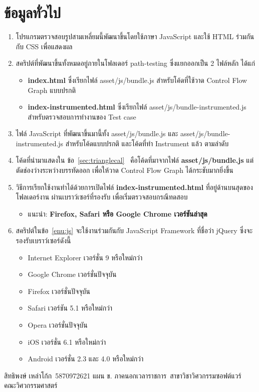 \documentclass[12pt,a4paper]{article}
\newcommand{\sitdhibong}{สิทธิพงษ์ เหล่าโก้ก}
\newcommand{\studentid}{5870972621}
\newcommand{\department}{สาขาวิชาวิศวกรรมซอฟต์แวร์}
\newcommand{\faculty}{คณะวิศวกรรมศาสตร์}
\newcommand{\myprogram}{แผน ข. ภาคนอกเวลาราชการ}
\newcommand{\numbername}{ข้อ}
\begin{document}
   \section{ข้อมูลทั่วไป}
   \label{sec:general}
   \begin{enumerate}
       \item โปรแกรมตรวจสอบรูปสามเหลี่ยมนี้พัฒนาขึ้นโดยใช้ภาษา JavaScript และใช้ HTML ร่วมกันกับ CSS เพื่อแสดงผล
       \item สคริปต์ที่พัฒนาขึ้นทั้งหมดอยู่ภายในโฟลเดอร์ path-testing ซึ่งแยกออกเป็น 2 ไฟล์หลัก ได้แก่
           \begin{itemize}
               \item {\bf index.html} ซึ่งเรียกไฟล์ asset/js/bundle.js สำหรับโค้ดที่ใช้วาด Control Flow Graph แบบปรกติ
               \item {\bf index-instrumented.html} ซึ่งเรียกไฟล์ asset/js/bundle-instrumented.js สำหรับตรวจสอบการทำงานของ Test case
           \end{itemize}
       \item ไฟล์ JavaScript ที่พัฒนาขึ้นมานี้ทั้ง asset/js/bundle.js และ asset/js/bundle-instrumented.js สำหรับโค้ดแบบปรกติ และโค้ดที่ทำ Instrument แล้ว ตามลำดับ \label{enu:js}
       \item โค้ดที่นำมาแสดงใน \numbername~\ref{sec:trianglecal}~{\bf {}} คือโค้ดที่มาจากไฟล์ {\bf asset/js/bundle.js} แต่ตัดช่องว่างระหว่างบรรทัดออก เพื่อให้วาด Control Flow Graph ได้กระชับมากยิ่งขึ้น
       \item วิธีการเรียกใช้งานทำได้ด้วยการเปิดไฟล์ {\bf index-instrumented.html} ที่อยู่ด้านบนสุดของโฟลเดอร์งาน ผ่านเบราว์เซอร์ที่รองรับ เพื่อเริ่มตรวจสอบกรณีทดสอบ
           \begin{itemize}
               \item แนะนำ: {\bf Firefox, Safari หรือ Google Chrome เวอร์ชันล่าสุด}
           \end{itemize}
       \item สคริปต์ในข้อ~\ref{enu:js} จะใช้งานร่วมกันกับ JavaScript Framework ที่ชื่อว่า jQuery ซึ่งจะรองรับเบราว์เซอร์ดังนี้
           \begin{itemize}
               \item Internet Explorer เวอร์ชั่น 9 หรือใหม่กว่า
               \item Google Chrome เวอร์ชั่นปัจจุบัน
               \item Firefox เวอร์ชั่นปัจจุบัน
               \item Safari เวอร์ชัน 5.1 หรือใหม่กว่า 
               \item Opera เวอร์ชั่นปัจจุบัน 
               \item iOS เวอร์ชั่น 6.1 หรือใหม่กว่า
               \item Android เวอร์ชั่น 2.3 และ 4.0 หรือใหม่กว่า
           \end{itemize}
   \end{enumerate}
   \vfill
   \noindent\sitdhibong\, \studentid \newline
   \myprogram\, \newline
   \department\, \faculty
\end{document}
